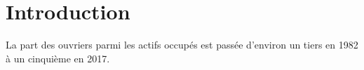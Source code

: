 \documentclass{article}
\begin{document}
\section{Introduction}

La part des ouvriers parmi les actifs occupés est passée d'environ un tiers en 1982 à un cinquième en 2017.
\end{document}
